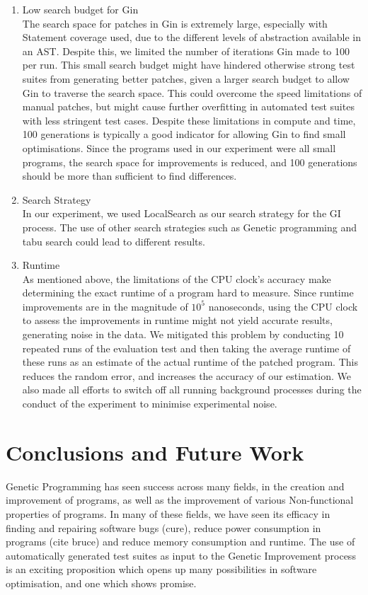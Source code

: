\documentclass[titlepage]{article}
\begin{document}
\begin{enumerate}
	\item Low search budget for Gin \\
The search space for patches in Gin is extremely large, especially with Statement coverage used, due to the different levels of abstraction available in an AST. Despite this, we limited the number of iterations Gin made to 100 per run. This small search budget might have hindered otherwise strong test suites from generating better patches, given a larger search budget to allow Gin to traverse the search space. This could overcome the speed limitations of manual patches, but might cause further overfitting in automated test suites with less stringent test cases. Despite these limitations in compute and time, 100 generations is typically a good indicator for allowing Gin to find small optimisations. Since the programs used in our experiment were all small programs, the search space for improvements is reduced, and 100 generations should be more than sufficient to find differences.

	\item Search Strategy \\
In our experiment, we used LocalSearch as our search strategy for the GI process. The use of other search strategies such as Genetic programming and tabu search could lead to different results. 

	\item Runtime \\
As mentioned above, the limitations of the CPU clock’s accuracy make determining the exact runtime of a program hard to measure. Since runtime improvements are in the magnitude of $10^5$ nanoseconds, using the CPU clock to assess the improvements in runtime might not yield accurate results, generating noise in the data. We mitigated this  problem by conducting 10 repeated runs of the evaluation test and then taking the average runtime of these runs as an estimate of the actual runtime of the patched program. This reduces the random error, and increases the accuracy of our estimation. We also made all efforts to switch off all running background processes during the conduct of the experiment to minimise experimental noise.

\end{enumerate}
\section{Conclusions and Future Work}

Genetic Programming has seen success across many fields, in the creation and improvement of programs, as well as the improvement of various Non-functional properties of programs. In many of these fields, we have seen its efficacy in finding and repairing software bugs (cure), reduce power consumption in programs (cite bruce) and reduce memory consumption and runtime.\cite{yuewu2015}
The use of automatically generated test suites as input to the Genetic Improvement process is an exciting proposition which opens up many possibilities in software optimisation, and one which shows promise.
\end{document}
